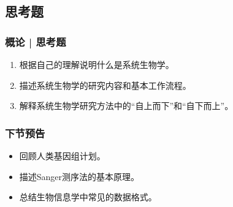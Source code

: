 \subsection{思考题}
\begin{frame}
  \frametitle{概论 | 思考题}
  \begin{enumerate}
    \item 根据自己的理解说明什么是系统生物学。
    \item 描述系统生物学的研究内容和基本工作流程。
    \item 解释系统生物学研究方法中的“自上而下”和“自下而上”。
  \end{enumerate}
\end{frame}

\begin{frame}
  \frametitle{下节预告}
  \begin{itemize}
    \item 回顾人类基因组计划。
    \item 描述Sanger测序法的基本原理。
    \item 总结生物信息学中常见的数据格式。
  \end{itemize}
\end{frame}




